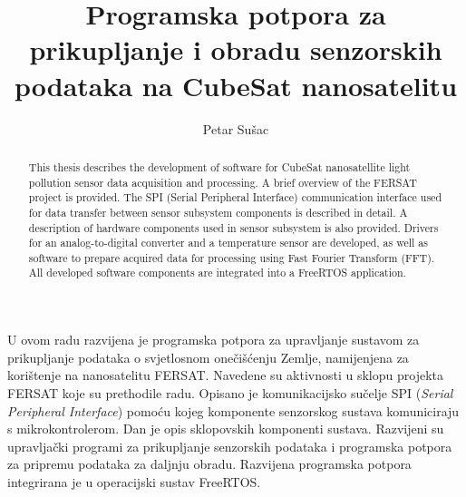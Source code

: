 \documentclass[times, utf8, zavrsni, numeric]{fer}
\begin{document}

\title{Programska potpora za prikupljanje i obradu senzorskih podataka na CubeSat nanosatelitu}

\author{Petar Sušac}


%

\zahvala{}

\tableofcontents










\begin{sazetak}
U ovom radu razvijena je programska potpora za upravljanje sustavom za prikupljanje podataka o svjetlosnom onečišćenju Zemlje, namijenjena za korištenje na nanosatelitu FERSAT. Navedene su aktivnosti u sklopu projekta FERSAT koje su prethodile radu. Opisano je komunikacijsko sučelje SPI (\textit{Serial Peripheral Interface}) pomoću kojeg komponente senzorskog sustava komuniciraju s mikrokontrolerom. Dan je opis sklopovskih komponenti sustava. Razvijeni su upravljački programi za prikupljanje senzorskih podataka i programska potpora za pripremu podataka za daljnju obradu. Razvijena programska potpora integrirana je u operacijski sustav FreeRTOS.

\end{sazetak}

\begin{abstract}
This thesis describes the development of software for CubeSat nanosatellite light pollution sensor data acquisition and processing. A brief overview of the FERSAT project is provided. The SPI (Serial Peripheral Interface) communication interface used for data transfer between sensor subsystem components is described in detail. A description of hardware components used in sensor subsystem is also provided. Drivers for an analog-to-digital converter and a temperature sensor are developed, as well as software to prepare acquired data for processing using Fast Fourier Transform (FFT). All developed software components are integrated into a FreeRTOS application.

\end{abstract}
\end{document}
